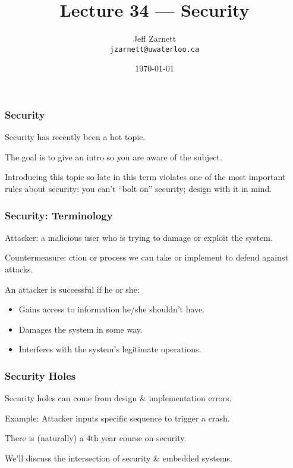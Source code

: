 
\usepackage{tikz-3dplot}

\title{Lecture 34 --- Security}

\author{Jeff Zarnett \\ \small \texttt{jzarnett@uwaterloo.ca}}
\date{\today}



\begin{frame}
  \titlepage
\end{frame}


\begin{frame}
\frametitle{Security}
\begin{changemargin}{1cm}

Security has recently been a hot topic.

The goal is to give an intro so you are aware of the subject.

Introducing this topic so late in this term violates one of the most important rules about security: you can't ``bolt on'' security; design with it in mind.

\end{changemargin}
\end{frame}


\begin{frame}
\frametitle{Security: Terminology}
\begin{changemargin}{1cm}

\alert{Attacker}: a malicious user who is trying to damage or exploit the system.

\alert{Countermeasure}: ction or process we can take or implement to defend against attacks.

 An attacker is successful if he or she:
\begin{itemize}
	\item Gains access to information he/she shouldn't have.
	\item Damages the system in some way.
	\item Interferes with the system's legitimate operations.
\end{itemize} 

\end{changemargin}
\end{frame}

\begin{frame}
\frametitle{Security Holes}
\begin{changemargin}{1cm}

Security holes can come from design \& implementation errors.

Example: Attacker inputs specific sequence to trigger a crash.

There is (naturally) a 4th year course on security.

We'll discuss the intersection of security \& embedded systems.

\end{changemargin}
\end{frame}


